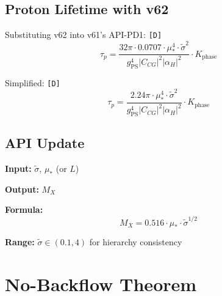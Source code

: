 \documentclass[11pt,a4paper]{article}
\newcommand{\tagD}{\textcolor{green!50!black}{\texttt{[D]}}}
\theoremstyle{definition}
\begin{document}
\subsection{Proton Lifetime with v62}
\label{subsec:tau-p-v62}

Substituting v62 into v61's API-PD1: \tagD{}
\begin{equation}
\label{eq:api-pd1-updated}
\tau_p = \frac{32\pi \cdot 0.0707 \cdot \mu_*^4 \cdot \tilde{\sigma}^2}{g_{\text{PS}}^4 |C_{CG}|^2 |\alpha_H|^2} \cdot K_{\text{phase}}
\end{equation}

Simplified: \tagD{}
\begin{equation}
\label{eq:tau-p-simplified}
\boxed{\tau_p = \frac{2.24 \pi \cdot \mu_*^4 \cdot \tilde{\sigma}^2}{g_{\text{PS}}^4 |C_{CG}|^2 |\alpha_H|^2} \cdot K_{\text{phase}}}
\end{equation}

\subsection{API Update}
\label{subsec:api-update}

\begin{apibox}
\textbf{Input:} $\tilde{\sigma}$, $\mu_*$ (or $L$)

\textbf{Output:} $M_X$

\textbf{Formula:}
\begin{equation}
\label{eq:api-mx1}
M_X = 0.516 \cdot \mu_* \cdot \tilde{\sigma}^{1/2}
\end{equation}

\textbf{Range:} $\tilde{\sigma} \in (0.1, 4)$ for hierarchy consistency
\end{apibox}

\section{No-Backflow Theorem}
\label{sec:no-backflow}
\end{document}
